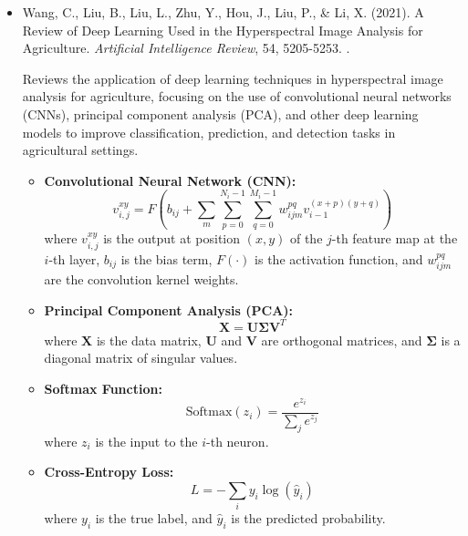 \documentclass[10pt,svgnames,fragile]{beamer}
\begin{document}
\begin{frame}
\tiny
\begin{itemize}
    
    \item Wang, C., Liu, B., Liu, L., Zhu, Y., Hou, J., Liu, P., \& Li, X. (2021). A Review of Deep Learning Used in the Hyperspectral Image Analysis for Agriculture. \textit{Artificial Intelligence Review}, 54, 5205-5253. \href{https://doi.org/10.1007/s10462-021-10018-y}{\color{blue}{DOI: 10.1007/s10462-021-10018-y}}. \cite{wangReviewDeepLearning2021}

    {\color{gray}Reviews the application of deep learning techniques in hyperspectral image analysis for agriculture, focusing on the use of convolutional neural networks (CNNs), principal component analysis (PCA), and other deep learning models to improve classification, prediction, and detection tasks in agricultural settings.}
    \begin{itemize} \tiny
    \item \textbf{Convolutional Neural Network (CNN):}
    \[
    v_{i,j}^{xy} = F \left( b_{ij} + \sum_{m} \sum_{p=0}^{N_i-1} \sum_{q=0}^{M_i-1} w_{ijm}^{pq} v_{i-1}^{(x+p)(y+q)} \right)
    \]
    where \( v_{i,j}^{xy} \) is the output at position \((x, y)\) of the \(j\)-th feature map at the \(i\)-th layer, \(b_{ij}\) is the bias term, \(F(\cdot)\) is the activation function, and \(w_{ijm}^{pq}\) are the convolution kernel weights.

    \item \textbf{Principal Component Analysis (PCA):}
    \[
    \mathbf{X} = \mathbf{U} \mathbf{\Sigma} \mathbf{V}^T
    \]
    where \( \mathbf{X} \) is the data matrix, \( \mathbf{U} \) and \( \mathbf{V} \) are orthogonal matrices, and \( \mathbf{\Sigma} \) is a diagonal matrix of singular values.

    \item \textbf{Softmax Function:}
    \[
    \text{Softmax}(z_i) = \frac{e^{z_i}}{\sum_{j} e^{z_j}}
    \]
    where \( z_i \) is the input to the \( i \)-th neuron.

    \item \textbf{Cross-Entropy Loss:}
    \[
    L = -\sum_{i} y_i \log(\hat{y}_i)
    \]
    where \( y_i \) is the true label, and \( \hat{y}_i \) is the predicted probability.
\end{itemize}

\end{itemize}
\end{frame}
\end{document}
